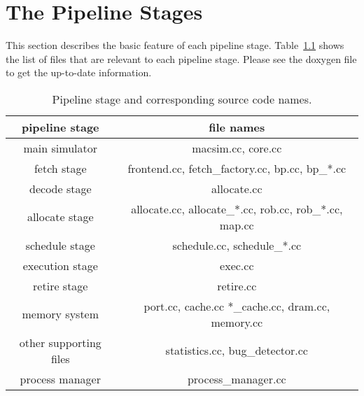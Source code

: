 


\chapter{The Pipeline Stages}

This section describes the basic feature of each pipeline stage. 
Table~\ref{table:pipeline} shows the list of files that are relevant to each pipeline stage. 
Please see the doxygen file to get the up-to-date information. 


\begin{table}[htb]
\begin{footnotesize}
\begin{center}
\caption{Pipeline stage and corresponding source code names.}
\label{table:pipeline}
\begin{tabular}{|c||c|}
\hline 
pipeline stage         & file names                                             \\ \hline \hline 
main simulator         & macsim.cc, core.cc                                     \\ \hline 
fetch stage            & frontend.cc, fetch\_factory.cc, bp.cc, bp\_*.cc        \\ \hline 
decode stage           & allocate.cc                                            \\ \hline 
allocate stage         & allocate.cc, allocate\_*.cc, rob.cc, rob\_*.cc, map.cc \\ \hline 
schedule stage         & schedule.cc, schedule\_*.cc                            \\ \hline 
execution stage        & exec.cc                                                \\ \hline 
retire stage           & retire.cc                                              \\ \hline 
memory system          & port.cc, cache.cc *\_cache.cc, dram.cc, memory.cc      \\ \hline \hline
other supporting files & statistics.cc, bug\_detector.cc                        \\ \hline \hline 
process manager        & process\_manager.cc                                    \\ \hline 
\end{tabular}
\end{center}
\end{footnotesize}
\end{table}



